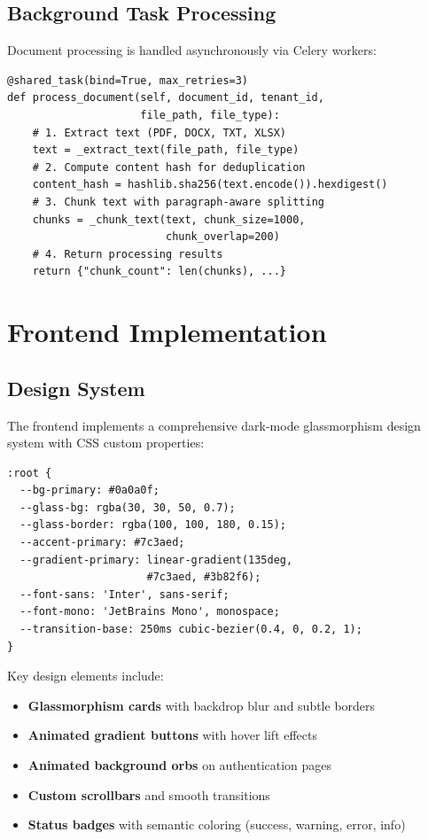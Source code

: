 \documentclass[12pt, a4paper]{report}
\begin{document}
\section{Background Task Processing}

Document processing is handled asynchronously via Celery workers:

\begin{lstlisting}[language=Python3, caption={Document Processing Pipeline}]
@shared_task(bind=True, max_retries=3)
def process_document(self, document_id, tenant_id,
                     file_path, file_type):
    # 1. Extract text (PDF, DOCX, TXT, XLSX)
    text = _extract_text(file_path, file_type)
    # 2. Compute content hash for deduplication
    content_hash = hashlib.sha256(text.encode()).hexdigest()
    # 3. Chunk text with paragraph-aware splitting
    chunks = _chunk_text(text, chunk_size=1000,
                         chunk_overlap=200)
    # 4. Return processing results
    return {"chunk_count": len(chunks), ...}
\end{lstlisting}

\chapter{Frontend Implementation}

\section{Design System}

The frontend implements a comprehensive dark-mode glassmorphism design system with CSS custom properties:

\begin{lstlisting}[language={}, caption={Design System CSS Variables (excerpt)}]
:root {
  --bg-primary: #0a0a0f;
  --glass-bg: rgba(30, 30, 50, 0.7);
  --glass-border: rgba(100, 100, 180, 0.15);
  --accent-primary: #7c3aed;
  --gradient-primary: linear-gradient(135deg,
                      #7c3aed, #3b82f6);
  --font-sans: 'Inter', sans-serif;
  --font-mono: 'JetBrains Mono', monospace;
  --transition-base: 250ms cubic-bezier(0.4, 0, 0.2, 1);
}
\end{lstlisting}

Key design elements include:
\begin{itemize}
    \item \textbf{Glassmorphism cards} with backdrop blur and subtle borders
    \item \textbf{Animated gradient buttons} with hover lift effects
    \item \textbf{Animated background orbs} on authentication pages
    \item \textbf{Custom scrollbars} and smooth transitions
    \item \textbf{Status badges} with semantic coloring (success, warning, error, info)
\end{itemize}
\end{document}
